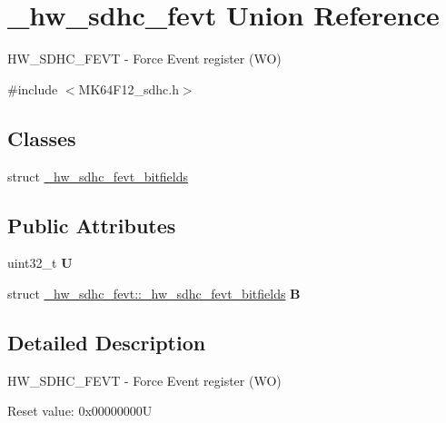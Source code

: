 \hypertarget{union__hw__sdhc__fevt}{}\section{\+\_\+hw\+\_\+sdhc\+\_\+fevt Union Reference}
\label{union__hw__sdhc__fevt}


H\+W\+\_\+\+S\+D\+H\+C\+\_\+\+F\+E\+VT -\/ Force Event register (WO)  




{\ttfamily \#include $<$M\+K64\+F12\+\_\+sdhc.\+h$>$}

\subsection*{Classes}
\begin{DoxyCompactItemize}
\item 
struct \hyperlink{struct__hw__sdhc__fevt_1_1__hw__sdhc__fevt__bitfields}{\+\_\+hw\+\_\+sdhc\+\_\+fevt\+\_\+bitfields}
\end{DoxyCompactItemize}
\subsection*{Public Attributes}
\begin{DoxyCompactItemize}
\item 
uint32\+\_\+t {\bfseries U}\hypertarget{union__hw__sdhc__fevt_a8d067fab1a0f33884d9f9f71e6e69416}{}\label{union__hw__sdhc__fevt_a8d067fab1a0f33884d9f9f71e6e69416}

\item 
struct \hyperlink{struct__hw__sdhc__fevt_1_1__hw__sdhc__fevt__bitfields}{\+\_\+hw\+\_\+sdhc\+\_\+fevt\+::\+\_\+hw\+\_\+sdhc\+\_\+fevt\+\_\+bitfields} {\bfseries B}\hypertarget{union__hw__sdhc__fevt_ae5571b22fadf4796b9d70009e3547d9f}{}\label{union__hw__sdhc__fevt_ae5571b22fadf4796b9d70009e3547d9f}

\end{DoxyCompactItemize}


\subsection{Detailed Description}
H\+W\+\_\+\+S\+D\+H\+C\+\_\+\+F\+E\+VT -\/ Force Event register (WO) 

Reset value\+: 0x00000000U

